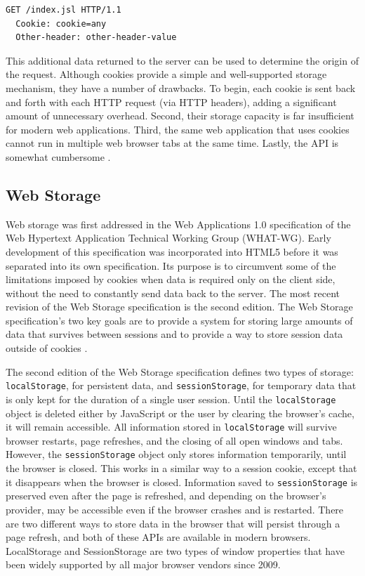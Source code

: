\begin{lstlisting}[language={}, caption={Cookie HTTP header}, label={lst:cookieHttpHeader}]
  GET /index.jsl HTTP/1.1
  Cookie: cookie=any
  Other-header: other-header-value
\end{lstlisting}

This additional data returned to the server can be used to determine the origin of the request. Although cookies provide a simple and well-supported storage mechanism, they have a number of drawbacks. To begin, each cookie is sent back and forth with each HTTP request (via HTTP headers), adding a significant amount of unnecessary overhead. Second, their storage capacity is far insufficient for modern web applications. Third, the same web application that uses cookies cannot run in multiple web browser tabs at the same time. Lastly, the API is somewhat cumbersome \autocite{kessin2011programming, macdonald2013html5}.

\subsection*{Web Storage}
Web storage was first addressed in the Web Applications 1.0 specification of the Web Hypertext Application Technical Working Group (WHAT-WG). Early development of this specification was incorporated into HTML5 before it was separated into its own specification. Its purpose is to circumvent some of the limitations imposed by cookies when data is required only on the client side, without the need to constantly send data back to the server. The most recent revision of the Web Storage specification is the second edition. The Web Storage specification's two key goals are to provide a system for storing large amounts of data that survives between sessions and to provide a way to store session data outside of cookies \autocite{frisbie2019professional}.

The second edition of the Web Storage specification defines two types of storage: \texttt{localStorage}, for persistent data, and \texttt{sessionStorage}, for temporary data that is only kept for the duration of a single user session. Until the \texttt{localStorage} object is deleted either by JavaScript or the user by clearing the browser's cache, it will remain accessible. All information stored in \texttt{localStorage} will survive browser restarts, page refreshes, and the closing of all open windows and tabs. However, the \texttt{sessionStorage} object only stores information temporarily, until the browser is closed. This works in a similar way to a session cookie, except that it disappears when the browser is closed. Information saved to \texttt{sessionStorage} is preserved even after the page is refreshed, and depending on the browser's provider, may be accessible even if the browser crashes and is restarted. There are two different ways to store data in the browser that will persist through a page refresh, and both of these APIs are available in modern browsers. LocalStorage and SessionStorage are two types of window properties that have been widely supported by all major browser vendors since 2009.

